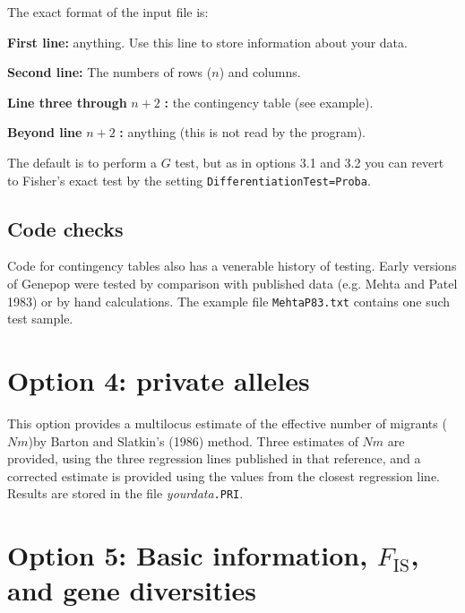 \documentclass[
  12pt,
]{book}
\begin{document}
The exact format of the input file is:

\textbf{First line:} anything. Use this line to store information about your data.

\textbf{Second line:} The numbers of rows (\(n\)) and columns.

\textbf{Line three through} \(n+2\) \textbf{:} the contingency table (see example).

\textbf{Beyond line} \(n+2\) \textbf{:} anything (this is not read by the program).

The default is to perform a \(G\) test, but as in options 3.1 and 3.2 you can revert to Fisher's exact test by the setting \texttt{DifferentiationTest=Proba}.

\hypertarget{code-checks-2}{%
\subsection{Code checks}\label{code-checks-2}}

Code for contingency tables also has a venerable history of testing. Early versions of Genepop were tested by comparison with published data (e.g. Mehta and Patel 1983) or by hand calculations. The example file \texttt{MehtaP83.txt} contains one such test sample.

\hypertarget{option-4-private-alleles}{%
\section{Option 4: private alleles}\label{option-4-private-alleles}}

This option provides a multilocus estimate of the effective number of migrants (\(Nm\))by Barton and Slatkin's (1986) method. Three estimates of \(Nm\) are provided, using the three regression lines published in that reference, and a corrected estimate is provided using the values from the closest regression line. Results are stored in the file \emph{yourdata}\texttt{.PRI}.

\hypertarget{option-5-basic-information-f_mathrmis-and-gene-diversities}{%
\section{\texorpdfstring{Option 5: Basic information, \(F_\mathrm{IS}\), and gene diversities}{Option 5: Basic information, F\_\textbackslash mathrm\{IS\}, and gene diversities}}\label{option-5-basic-information-f_mathrmis-and-gene-diversities}}
\end{document}
